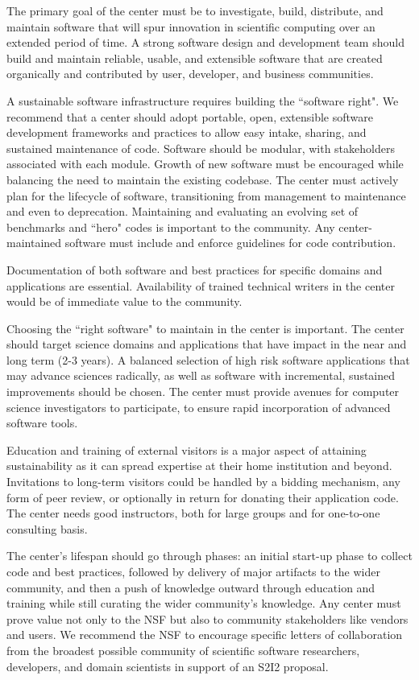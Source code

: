 The primary goal of the center must be to investigate, build, distribute, and maintain software that will spur innovation in scientific computing over an extended period of time. 
A strong software design and development team should build and maintain reliable, usable, and extensible software that are created organically and contributed by user, developer, and business communities.

A sustainable software infrastructure requires building the ``software right". 
We recommend that a center should adopt portable, open, extensible software development frameworks and practices to allow easy intake, sharing, and sustained maintenance of code. 
Software should be modular, with stakeholders associated with each module. Growth of new software must be encouraged while balancing the need to maintain the existing codebase. 
The center must actively plan for the lifecycle of software, transitioning from management to maintenance and even to deprecation. 
Maintaining and evaluating an evolving set of benchmarks and ``hero" codes is important to the community.
Any center-maintained software must include and enforce guidelines for code contribution.

Documentation of both software and best practices for specific domains and applications are essential. Availability of trained technical writers in the center would be of immediate value to the community.

Choosing the ``right software" to maintain in the center is important. 
The center should target science domains and applications that have impact in the near and long term (2-3 years). 
A balanced selection of high risk software applications that may advance sciences radically, as well as software with incremental, sustained improvements should be chosen. 
The center must provide avenues for computer science investigators to participate, to ensure rapid incorporation of advanced software tools.

Education and training of external visitors is a major aspect of attaining sustainability as it can spread expertise at their home institution and beyond. 
Invitations to long-term visitors could be handled by a bidding mechanism, any form of peer review, or optionally in return for donating their application code. 
The center needs good instructors, both for large groups and for one-to-one consulting basis.

The center's lifespan should go through phases: an initial start-up phase to collect code and best practices, followed by delivery of major artifacts to the wider community, and then a push of knowledge outward through education and training while still curating the wider community's knowledge. 
Any center must prove value not only to the NSF but also to community stakeholders like vendors and users. 
We recommend the NSF to encourage specific letters of collaboration from the broadest possible community of scientific software researchers, developers, and domain scientists in support of an S2I2 proposal.


